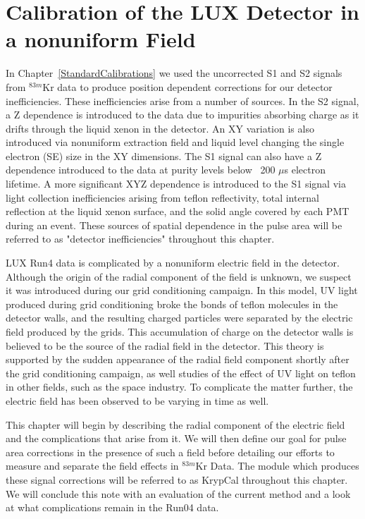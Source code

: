 \section{Calibration of the LUX Detector in a nonuniform Field} \label{Run04Corrections}

In Chapter~\ref{StandardCalibrations} we used the uncorrected S1 and S2 signals from $^{83m}$Kr data to produce position dependent corrections for our detector inefficiencies.  These inefficiencies arise from a number of sources.  In the S2 signal, a Z dependence is introduced to the data due to impurities absorbing charge as it drifts through the liquid xenon in the detector.  An XY variation is also introduced via nonuniform extraction field and liquid level changing the single electron (SE) size in the XY dimensions.  The S1 signal can also have a Z dependence introduced to the data at purity levels below ~200 $\mu$s electron lifetime.  A more significant XYZ dependence is introduced to the S1 signal via light collection inefficiencies arising from teflon reflectivity, total internal reflection at the liquid xenon surface, and the solid angle covered by each PMT during an event.  These sources of spatial dependence in the pulse area will be referred to as "detector inefficiencies" throughout this chapter.

LUX Run4 data is complicated by a nonuniform electric field in the detector.  Although the origin of the radial component of the field is unknown, we suspect it was introduced during our grid conditioning campaign.  In this model, UV light produced during grid conditioning broke the bonds of teflon molecules in the detector walls, and the resulting charged particles were separated by the electric field produced by the grids.  This accumulation of charge on the detector walls is believed to be the source of the radial field in the detector.  This theory is supported by the sudden appearance of the radial field component shortly after the grid conditioning campaign, as well studies of the effect of UV light on teflon in other fields, such as the space industry.  \cite{GridCond, Dever}  To complicate the matter further, the electric field has been observed to be varying in time as well.

  
This chapter will begin by describing the radial component of the electric field and the complications that arise from it.  We will then define our goal for pulse area corrections  in the presence of such a field before detailing our efforts to measure and separate the field effects in  $^{83m}$Kr Data.  The module which produces these signal corrections will be referred to as KrypCal throughout this chapter.  We will conclude this note with an evaluation of the current method and a look at what complications remain in the Run04 data.

